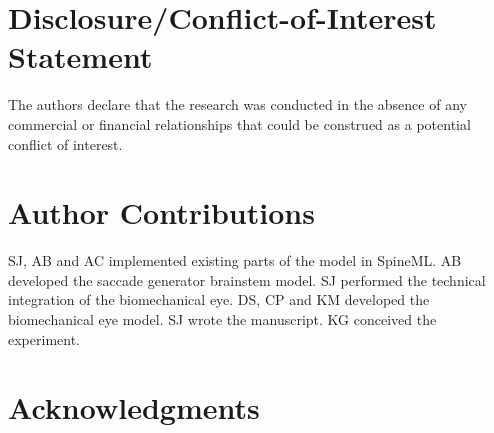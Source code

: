 \documentclass{frontiersSCNS}
\begin{document}


\section*{Disclosure/Conflict-of-Interest Statement}

The authors declare that the research was conducted in the absence of
any commercial or financial relationships that could be construed as a
potential conflict of interest.

\section*{Author Contributions}

SJ, AB and AC implemented existing parts of the model in SpineML. AB
developed the saccade generator brainstem model. SJ performed the
technical integration of the biomechanical eye. DS, CP and KM
developed the biomechanical eye model. SJ wrote the manuscript. KG
conceived the experiment. %

\section*{Acknowledgments}
\end{document}
